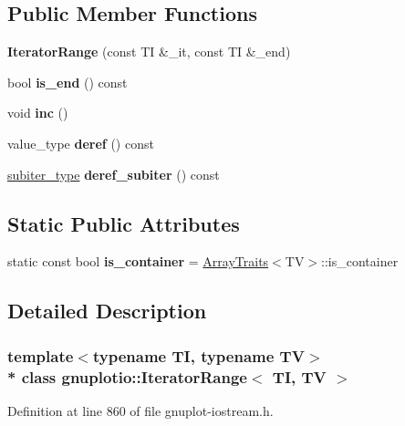 \subsection*{Public Member Functions}
\begin{DoxyCompactItemize}
\item 
{\bfseries Iterator\+Range} (const TI \&\+\_\+it, const TI \&\+\_\+end)\hypertarget{classgnuplotio_1_1_iterator_range_adb89135fc292dfc5152120bc7fe6135e}{}\label{classgnuplotio_1_1_iterator_range_adb89135fc292dfc5152120bc7fe6135e}

\item 
bool {\bfseries is\+\_\+end} () const \hypertarget{classgnuplotio_1_1_iterator_range_a9146c3be94e09b6318cb0590b5816d1e}{}\label{classgnuplotio_1_1_iterator_range_a9146c3be94e09b6318cb0590b5816d1e}

\item 
void {\bfseries inc} ()\hypertarget{classgnuplotio_1_1_iterator_range_a369f392a561011f8f1c93d13fd976878}{}\label{classgnuplotio_1_1_iterator_range_a369f392a561011f8f1c93d13fd976878}

\item 
value\+\_\+type {\bfseries deref} () const \hypertarget{classgnuplotio_1_1_iterator_range_a58c90f44319ecc5efe43b80892d3b7f2}{}\label{classgnuplotio_1_1_iterator_range_a58c90f44319ecc5efe43b80892d3b7f2}

\item 
\hyperlink{structgnuplotio_1_1_error___was_not_container}{subiter\+\_\+type} {\bfseries deref\+\_\+subiter} () const \hypertarget{classgnuplotio_1_1_iterator_range_a03ee1f4e4e321d6c9676b632dcfc5969}{}\label{classgnuplotio_1_1_iterator_range_a03ee1f4e4e321d6c9676b632dcfc5969}

\end{DoxyCompactItemize}
\subsection*{Static Public Attributes}
\begin{DoxyCompactItemize}
\item 
static const bool {\bfseries is\+\_\+container} = \hyperlink{classgnuplotio_1_1_array_traits}{Array\+Traits}$<$TV$>$\+::is\+\_\+container\hypertarget{classgnuplotio_1_1_iterator_range_a3f79d84bdf18761b6e49ae54d050f8ff}{}\label{classgnuplotio_1_1_iterator_range_a3f79d84bdf18761b6e49ae54d050f8ff}

\end{DoxyCompactItemize}


\subsection{Detailed Description}
\subsubsection*{template$<$typename TI, typename TV$>$\\*
class gnuplotio\+::\+Iterator\+Range$<$ T\+I, T\+V $>$}



Definition at line 860 of file gnuplot-\/iostream.\+h.

